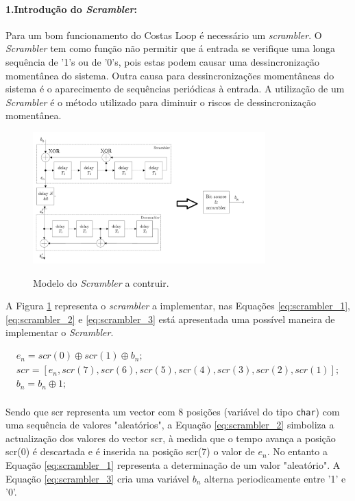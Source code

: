 \documentclass[11pt]{article}
\numberwithin{equation}{section}
\begin{document}
\paragraph{1.Introdução do \textit{Scrambler}:} \hspace{0pt}
\label{para:P3-1}


Para um bom funcionamento do Costas Loop é necessário um \textit{scrambler}. O \textit{Scrambler} tem como função não permitir que á entrada se verifique uma longa sequência de '1's ou de '0's, pois estas podem causar uma dessincronização momentânea do sistema. Outra causa para dessincronizações momentâneas do sistema é o aparecimento de sequências periódicas à entrada. A utilização de um \textit{Scrambler} é o  método utilizado para diminuir o riscos de dessincronização momentânea.
\begin{figure}[H]
	\centering
	\includegraphics[width=0.8\textwidth]{./Scrambler}~\\
	\caption{Modelo do \textit{Scrambler} a contruir.}
	\label{fig:scrambler}
\end{figure}

A Figura \ref{fig:scrambler} representa o \textit{scrambler} a implementar, nas Equações \ref{eq:scrambler_1}, \ref{eq:scrambler_2} e \ref{eq:scrambler_3} está apresentada uma possível maneira de implementar o \textit{Scrambler}.

\begin{gather}
e_n=scr(0) \oplus scr(1) \oplus b_n; \\
\label{eq:scrambler_1}
scr=[e_n, scr(7), scr(6), scr(5), scr(4), scr(3), scr(2), scr(1)];\\
\label{eq:scrambler_2}
b_n=b_n \oplus 1;\\
\label{eq:scrambler_3}
\end{gather}

Sendo que scr representa um vector com 8 posições (variável do tipo \texttt{char}) com uma sequência de valores "aleatórios", a Equação \ref{eq:scrambler_2} simboliza a actualização dos valores do vector scr, à medida que o tempo avança a posição scr(0) é descartada e é inserida na posição scr(7) o valor de $ e_n $. No entanto a Equação \ref{eq:scrambler_1} representa a determinação de um valor "aleatório". A Equação \ref{eq:scrambler_3} cria uma variável $ b_n $ alterna periodicamente entre '1' e '0'.
\end{document}
